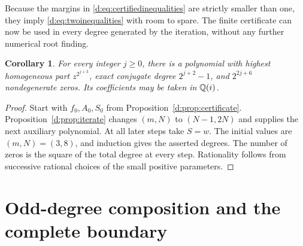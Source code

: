\documentclass[UTF8,11pt]{ctexart}
\newtheorem{cor}[thm]{Corollary}
\theoremstyle{definition}
\numberwithin{equation}{section}
\begin{document}
Because the margins in \eqref{d:eq:certifiedinequalities} are strictly
smaller than one, they imply \eqref{d:eq:twoinequalities} with room to spare.
The finite certificate can now be used in every degree generated by the
iteration, without any further numerical root finding.
\begin{cor}\label{d:cor:powersoftwo}
For every integer $j\ge0$, there is a polynomial with highest homogeneous
part $z^{2^{j+3}}$, exact conjugate degree $2^{j+2}-1$, and
$2^{2j+6}$ nondegenerate zeros. Its coefficients may be taken in $\mathbb Q(i)$.
\end{cor}
\begin{proof}
Start with $f_0,A_0,S_0$ from Proposition~\ref{d:prop:certificate}.
Proposition~\ref{d:prop:iterate} changes $(m,N)$ to $(N-1,2N)$ and supplies
the next auxiliary polynomial. At all later steps take $S=w$.
The initial values are $(m,N)=(3,8)$, and induction gives the asserted
degrees. The number of zeros is the square of the total degree at every
step. Rationality follows from successive rational choices of the small
positive parameters.
\end{proof}

\section{Odd-degree composition and the complete boundary}\label{d:sec:composition}
\end{document}
